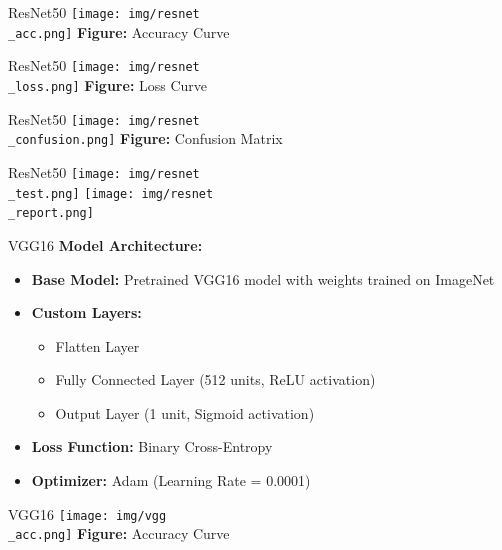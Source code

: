 \documentclass{beamer}
\begin{document}
\begin{frame}{ResNet50}
	\centering
     	\texttt{[image: img/resnet\\\_acc.png]}
    	\newline
    	\textbf{Figure:} Accuracy Curve
\end{frame}

\begin{frame}{ResNet50}
	\centering
     	\texttt{[image: img/resnet\\\_loss.png]}
    	\newline
    	\textbf{Figure:} Loss Curve
\end{frame}

\begin{frame}{ResNet50}
	\centering
     	\texttt{[image: img/resnet\\\_confusion.png]}
    	\newline
    	\textbf{Figure:} Confusion Matrix
\end{frame}

\begin{frame}{ResNet50}
	\centering
     	\texttt{[image: img/resnet\\\_test.png]}
	\texttt{[image: img/resnet\\\_report.png]}
\end{frame}

\begin{frame}{VGG16}
    \textbf{Model Architecture:}
    \begin{itemize}
        \item \textbf{Base Model:} Pretrained VGG16 model with weights trained on ImageNet
        \item \textbf{Custom Layers:}
        \begin{itemize}
            \item Flatten Layer
            \item Fully Connected Layer (512 units, ReLU activation)
            \item Output Layer (1 unit, Sigmoid activation)
        \end{itemize}
        \item \textbf{Loss Function:} Binary Cross-Entropy
        \item \textbf{Optimizer:} Adam (Learning Rate = 0.0001)
    \end{itemize}
\end{frame}

\begin{frame}{VGG16}
	\centering
     	\texttt{[image: img/vgg\\\_acc.png]}
    	\newline
    	\textbf{Figure:} Accuracy Curve
\end{frame}
\end{document}
